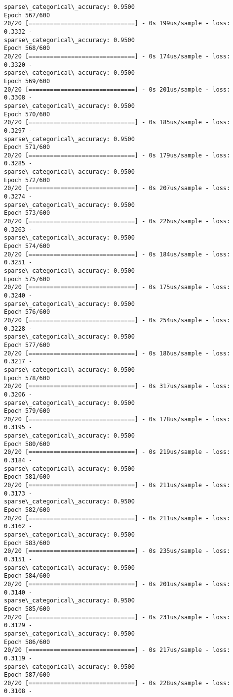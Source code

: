 \documentclass[11pt]{article}
\begin{document}
\begin{Verbatim}[commandchars=\\\{\}]
sparse\_categorical\_accuracy: 0.9500
Epoch 567/600
20/20 [==============================] - 0s 199us/sample - loss: 0.3332 -
sparse\_categorical\_accuracy: 0.9500
Epoch 568/600
20/20 [==============================] - 0s 174us/sample - loss: 0.3320 -
sparse\_categorical\_accuracy: 0.9500
Epoch 569/600
20/20 [==============================] - 0s 201us/sample - loss: 0.3308 -
sparse\_categorical\_accuracy: 0.9500
Epoch 570/600
20/20 [==============================] - 0s 185us/sample - loss: 0.3297 -
sparse\_categorical\_accuracy: 0.9500
Epoch 571/600
20/20 [==============================] - 0s 179us/sample - loss: 0.3285 -
sparse\_categorical\_accuracy: 0.9500
Epoch 572/600
20/20 [==============================] - 0s 207us/sample - loss: 0.3274 -
sparse\_categorical\_accuracy: 0.9500
Epoch 573/600
20/20 [==============================] - 0s 226us/sample - loss: 0.3263 -
sparse\_categorical\_accuracy: 0.9500
Epoch 574/600
20/20 [==============================] - 0s 184us/sample - loss: 0.3251 -
sparse\_categorical\_accuracy: 0.9500
Epoch 575/600
20/20 [==============================] - 0s 175us/sample - loss: 0.3240 -
sparse\_categorical\_accuracy: 0.9500
Epoch 576/600
20/20 [==============================] - 0s 254us/sample - loss: 0.3228 -
sparse\_categorical\_accuracy: 0.9500
Epoch 577/600
20/20 [==============================] - 0s 186us/sample - loss: 0.3217 -
sparse\_categorical\_accuracy: 0.9500
Epoch 578/600
20/20 [==============================] - 0s 317us/sample - loss: 0.3206 -
sparse\_categorical\_accuracy: 0.9500
Epoch 579/600
20/20 [==============================] - 0s 178us/sample - loss: 0.3195 -
sparse\_categorical\_accuracy: 0.9500
Epoch 580/600
20/20 [==============================] - 0s 219us/sample - loss: 0.3184 -
sparse\_categorical\_accuracy: 0.9500
Epoch 581/600
20/20 [==============================] - 0s 211us/sample - loss: 0.3173 -
sparse\_categorical\_accuracy: 0.9500
Epoch 582/600
20/20 [==============================] - 0s 211us/sample - loss: 0.3162 -
sparse\_categorical\_accuracy: 0.9500
Epoch 583/600
20/20 [==============================] - 0s 235us/sample - loss: 0.3151 -
sparse\_categorical\_accuracy: 0.9500
Epoch 584/600
20/20 [==============================] - 0s 201us/sample - loss: 0.3140 -
sparse\_categorical\_accuracy: 0.9500
Epoch 585/600
20/20 [==============================] - 0s 231us/sample - loss: 0.3129 -
sparse\_categorical\_accuracy: 0.9500
Epoch 586/600
20/20 [==============================] - 0s 217us/sample - loss: 0.3119 -
sparse\_categorical\_accuracy: 0.9500
Epoch 587/600
20/20 [==============================] - 0s 228us/sample - loss: 0.3108 -

\end{Verbatim}
\end{document}
